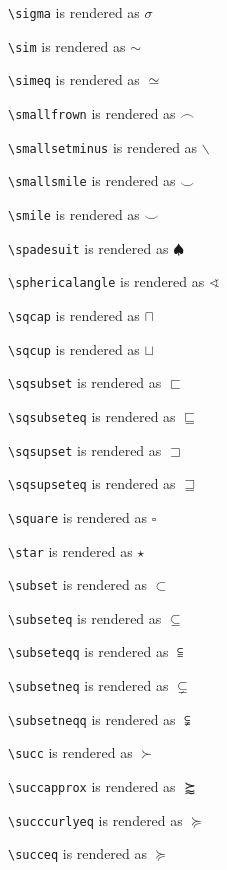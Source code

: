 \texttt{\textbackslash sigma} is rendered as $\sigma$

\texttt{\textbackslash sim} is rendered as $\sim$

\texttt{\textbackslash simeq} is rendered as $\simeq$

\texttt{\textbackslash smallfrown} is rendered as $\smallfrown$

\texttt{\textbackslash smallsetminus} is rendered as $\smallsetminus$

\texttt{\textbackslash smallsmile} is rendered as $\smallsmile$

\texttt{\textbackslash smile} is rendered as $\smile$

\texttt{\textbackslash spadesuit} is rendered as $\spadesuit$

\texttt{\textbackslash sphericalangle} is rendered as $\sphericalangle$

\texttt{\textbackslash sqcap} is rendered as $\sqcap$

\texttt{\textbackslash sqcup} is rendered as $\sqcup$

\texttt{\textbackslash sqsubset} is rendered as $\sqsubset$

\texttt{\textbackslash sqsubseteq} is rendered as $\sqsubseteq$

\texttt{\textbackslash sqsupset} is rendered as $\sqsupset$

\texttt{\textbackslash sqsupseteq} is rendered as $\sqsupseteq$

\texttt{\textbackslash square} is rendered as $\square$

\texttt{\textbackslash star} is rendered as $\star$

\texttt{\textbackslash subset} is rendered as $\subset$

\texttt{\textbackslash subseteq} is rendered as $\subseteq$

\texttt{\textbackslash subseteqq} is rendered as $\subseteqq$

\texttt{\textbackslash subsetneq} is rendered as $\subsetneq$

\texttt{\textbackslash subsetneqq} is rendered as $\subsetneqq$

\texttt{\textbackslash succ} is rendered as $\succ$

\texttt{\textbackslash succapprox} is rendered as $\succapprox$

\texttt{\textbackslash succcurlyeq} is rendered as $\succcurlyeq$

\texttt{\textbackslash succeq} is rendered as $\succeq$

